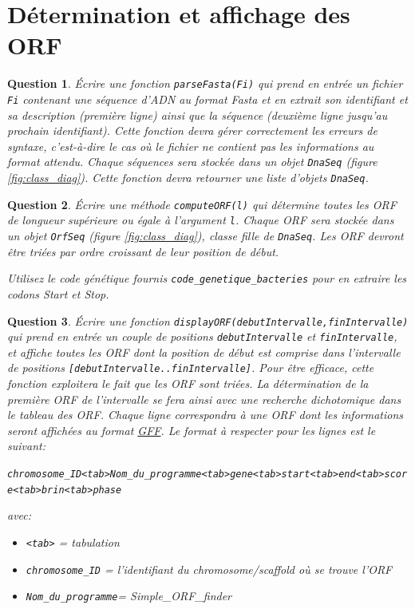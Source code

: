 \documentclass[10pt]{article}
\newtheorem{question}{Question}
\begin{document}
\section{Détermination et affichage des ORF}

\begin{question}
Écrire une fonction {\tt parseFasta(Fi)} qui prend en entrée un fichier {\tt Fi} contenant une séquence d’ADN au format Fasta et en extrait son identifiant et sa description (première ligne) ainsi que la séquence  (deuxième ligne jusqu'au prochain identifiant). Cette fonction devra gérer correctement les erreurs de syntaxe, c’est-à-dire le cas où le fichier ne contient pas les informations au format attendu.
Chaque séquences sera stockée dans un objet {\tt DnaSeq} (figure \ref{fig:class_diag}).
Cette fonction devra retourner une liste d'objets {\tt DnaSeq}.
\end{question} 


\begin{question}
Écrire une méthode {\tt computeORF(l)} qui détermine toutes les ORF de longueur supérieure ou égale à l'argument {\tt l}. Chaque ORF sera stockée dans un objet {\tt OrfSeq} (figure \ref{fig:class_diag}), classe fille de {\tt DnaSeq}.
Les ORF devront être triées par ordre croissant de leur position de début.

Utilisez le code génétique fournis {\tt code\_genetique\_bacteries} pour en extraire les codons Start et Stop.
\end{question}

\begin{question} 
Écrire une fonction {\tt displayORF(debutIntervalle,finIntervalle)}  qui prend en entrée un couple de positions {\tt debutIntervalle} et {\tt finIntervalle}, et affiche toutes les ORF dont la position de début est comprise dans l'intervalle de positions {\tt [debutIntervalle..finIntervalle]}. Pour être efficace, cette fonction exploitera le fait que les ORF sont triées. La
détermination de la première ORF de l'intervalle se fera ainsi avec une recherche dichotomique dans le tableau des ORF.
Chaque ligne correspondra à une ORF dont les informations seront affichées au format \href{https://fr.wikipedia.org/wiki/General_feature_format}{GFF}. Le format à respecter pour les lignes est le suivant:

{\tt chromosome\_ID<tab>Nom\_du\_programme<tab>gene<tab>start<tab>end<tab>score<tab>brin<tab>phase}

avec:
\begin{itemize}
    \item {\tt <tab>} = tabulation
    \item {\tt chromosome\_ID} = l'identifiant du chromosome/scaffold où se trouve l'ORF
    \item {\tt Nom\_du\_programme}= {Simple\_ORF\_finder}
\end{itemize}

\end{question} 
\end{document}
